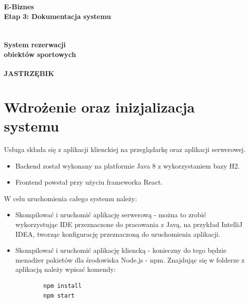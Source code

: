 \documentclass[a4paper,11pt]{article}
\begin{document}
\begin{titlepage}
\begin{center}
\textbf{\huge{E-Biznes}}
\textbf{\LARGE{\\Etap 3: Dokumentacja systemu}}
\textbf{\Huge{\\~\\~\\System rezerwacji\\obiektów sportowych\\~\\ JASTRZĘBIK}} 
\end{center}

\end{titlepage}

\setcounter{page}{2}

\tableofcontents
{}
\newpage


\section{Wdrożenie oraz inizjalizacja systemu}
    Usługa składa się z aplikacji klienckiej na przeglądarkę oraz aplikacji serwerowej.
    
    \begin{itemize}
        \item Backend został wykonany na platformie Java 8 z wykorzystaniem bazy H2. %
        \item Frontend powstał przy użyciu frameworka React.
    \end{itemize}
    
    W celu uruchomienia całego systemu należy:
    
    \begin{itemize}
        \item Skompilować i uruchomić aplikację serwerową - można to zrobić wykorzystując IDE przeznaczone do pracowania z Javą, na przykład IntelliJ IDEA, tworząc konfigurację przeznaczoną do uruchomienia aplikacji. 
        \item Skompilować i uruchomić aplikację kliencką - konieczny do tego będzie menadżer pakietów dla środowiska Node.js - npm. Znajdując się w folderze z aplikacją należy wpisać komendy:
        \begin{verbatim}
        npm install
        npm start
        \end{verbatim}
    \end{itemize}
\end{document}
